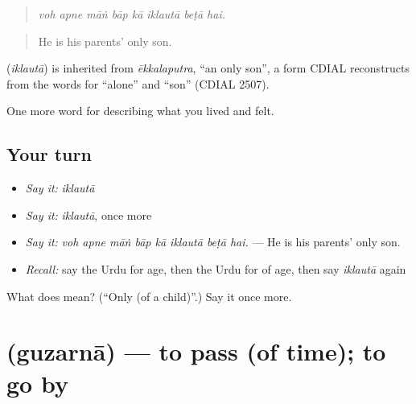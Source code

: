 \begin{quote}
       
\end{quote}

\begin{quote}
\emph{voh apne māṅ bāp kā iklautā beṭā hai.}
\end{quote}

\begin{quote}
He is his parents' only son.
\end{quote}

\begin{cousinweb}
\textbf{} (\emph{iklautā}) is inherited from \emph{ēkkalaputra}, \textquotedblleft{}an only son\textquotedblright{}, a form CDIAL reconstructs from the words for \textquotedblleft{}alone\textquotedblright{} and \textquotedblleft{}son\textquotedblright{} (CDIAL 2507).
\end{cousinweb}

\begin{grammarlens}[title={What you've built}]
One more word for describing what you lived and felt.
\end{grammarlens}

\subsection*{Your turn}
\begin{itemize}
\raggedright
  \item \emph{Say it:} \emph{iklautā}
  \item \emph{Say it:} \emph{iklautā}, once more
  \item \emph{Say it:} \emph{voh apne māṅ bāp kā iklautā beṭā hai.} — He is his parents' only son.
  \item \emph{Recall:} say the Urdu for age, then the Urdu for of age, then say \emph{iklautā} again
\end{itemize}

\begin{tcolorbox}[breakable,colback=teal!4,colframe=teal!35!black,title={Before you move on}]
What does  mean? (\textquotedblleft{}Only (of a child)\textquotedblright{}.) Say it once more.
\end{tcolorbox}
\section[\texorpdfstring{\ur{گزرنا} (guzarnā)}{گزرنا (guzarnā)}]{ (guzarnā) — to pass (of time); to go by}

